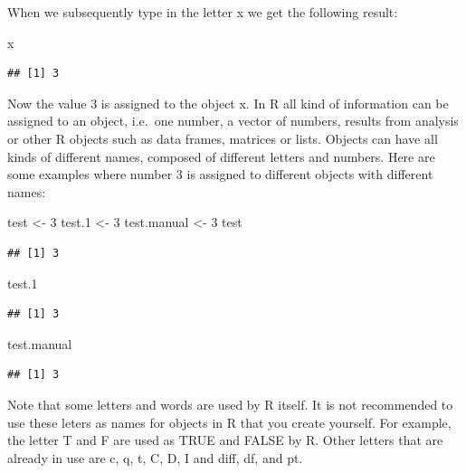 \documentclass[]{book}
\newenvironment{Shaded}{\begin{snugshade}}{\end{snugshade}}
\newcommand{\DecValTok}[1]{\textcolor[rgb]{0.00,0.00,0.81}{#1}}
\newcommand{\StringTok}[1]{\textcolor[rgb]{0.31,0.60,0.02}{#1}}
\newcommand{\NormalTok}[1]{#1}
\begin{document}
When we subsequently type in the letter x we get the following result:

\begin{Shaded}
\begin{Highlighting}[]
\NormalTok{x }
\end{Highlighting}
\end{Shaded}

\begin{verbatim}
## [1] 3
\end{verbatim}

Now the value 3 is assigned to the object x. In R all kind of
information can be assigned to an object, i.e.~one number, a vector of
numbers, results from analysis or other R objects such as data frames,
matrices or lists. Objects can have all kinds of different names,
composed of different letters and numbers. Here are some examples where
number 3 is assigned to different objects with different names:

\begin{Shaded}
\begin{Highlighting}[]
\NormalTok{test <-}\StringTok{ }\DecValTok{3}
\NormalTok{test.}\DecValTok{1}\NormalTok{ <-}\StringTok{ }\DecValTok{3}
\NormalTok{test.manual <-}\StringTok{ }\DecValTok{3}
\NormalTok{test}
\end{Highlighting}
\end{Shaded}

\begin{verbatim}
## [1] 3
\end{verbatim}

\begin{Shaded}
\begin{Highlighting}[]
\NormalTok{test.}\DecValTok{1}
\end{Highlighting}
\end{Shaded}

\begin{verbatim}
## [1] 3
\end{verbatim}

\begin{Shaded}
\begin{Highlighting}[]
\NormalTok{test.manual }
\end{Highlighting}
\end{Shaded}

\begin{verbatim}
## [1] 3
\end{verbatim}

Note that some letters and words are used by R itself. It is not
recommended to use these leters as names for objects in R that you
create yourself. For example, the letter T and F are used as TRUE and
FALSE by R. Other letters that are already in use are c, q, t, C, D, I
and diff, df, and pt.
\end{document}
